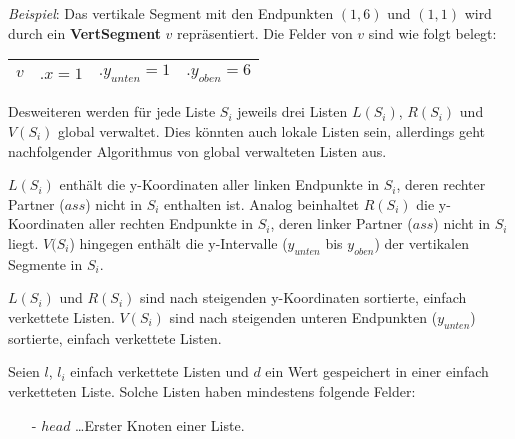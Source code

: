 \documentclass{article}
\begin{document}
\emph{Beispiel}: Das vertikale Segment mit den Endpunkten $(1, 6)$ und $(1, 1)$
wird durch ein {\bfseries VertSegment} $v$ repr{\"a}sentiert. Die Felder von $v$
sind wie folgt belegt:

\begin{center}
\begin{tabular}{l||l|l|l|}
  \hline
  $v$ & $.x = 1$ & $.y_{unten} = 1$ & $.y_{oben} = 6$ \tabularnewline
  \hline
\end{tabular}
\end{center}

%
Desweiteren werden f{\"u}r jede Liste $S_i$ jeweils drei Listen $L(S_i)$, $R(S_i)$
und $V(S_i)$ global verwaltet. Dies k{\"o}nnten auch lokale Listen sein,
allerdings geht nachfolgender Algorithmus von global verwalteten Listen aus.

$L(S_i)$ enth{\"a}lt die y-Koordinaten aller linken Endpunkte in $S_i$, deren
rechter Partner ($ass$) nicht in $S_i$ enthalten ist. Analog beinhaltet $R(S_i)$
die y-Koordinaten aller rechten Endpunkte in $S_i$, deren linker Partner ($ass$)
nicht in $S_i$ liegt. $V(S_i$) hingegen enth{\"a}lt die y-Intervalle ($y_{unten}$
bis $y_{oben}$) der vertikalen Segmente in $S_i$.

$L(S_i)$ und $R(S_i)$ sind nach steigenden y-Koordinaten sortierte, einfach
verkettete Listen. $V(S_i)$ sind nach steigenden unteren Endpunkten ($y_{unten}$)
sortierte, einfach verkettete Listen.

Seien $l$, $l_i$ einfach verkettete Listen und $d$ ein Wert gespeichert in einer
einfach verketteten Liste. Solche Listen haben mindestens folgende Felder:
\begin{itemize}
  \item[-] $head$ \ldots Erster Knoten einer Liste.
\end{itemize}
\end{document}
